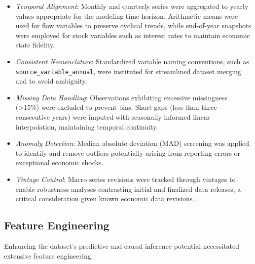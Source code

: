 \begin{itemize}
  \item \textit{Temporal Alignment}: Monthly and quarterly series were aggregated to yearly values appropriate for the modeling time horizon. Arithmetic means were used for flow variables to preserve cyclical trends, while end-of-year snapshots were employed for stock variables such as interest rates to maintain economic state fidelity.
  
  \item \textit{Consistent Nomenclature}: Standardized variable naming conventions, such as \texttt{source\_variable\_annual}, were instituted for streamlined dataset merging and to avoid ambiguity.

  \item \textit{Missing Data Handling}: Observations exhibiting excessive missingness (>15\%) were excluded to prevent bias. Short gaps (less than three consecutive years) were imputed with seasonally informed linear interpolation, maintaining temporal continuity.

  \item \textit{Anomaly Detection}: Median absolute deviation (MAD) screening was applied to identify and remove outliers potentially arising from reporting errors or exceptional economic shocks.

  \item \textit{Vintage Control}: Macro series revisions were tracked through vintages to enable robustness analyses contrasting initial and finalized data releases, a critical consideration given known economic data revisions \citep{garcia2020}.
\end{itemize}

\subsection{Feature Engineering}\label{subsec:feature_engineering}

Enhancing the dataset's predictive and causal inference potential necessitated extensive feature engineering:

